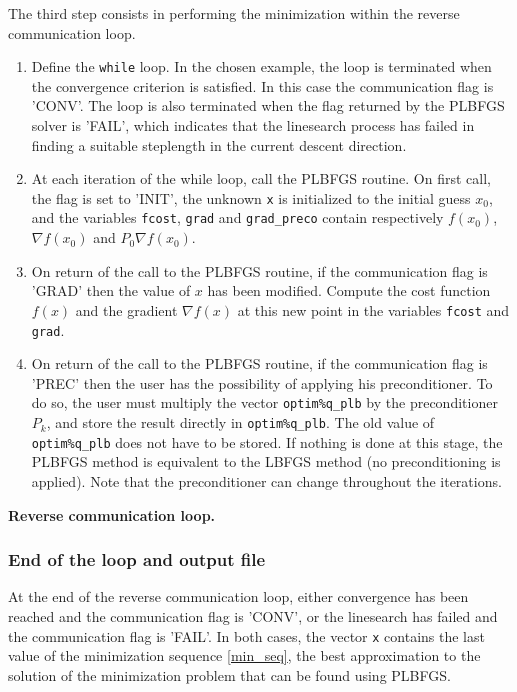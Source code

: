\documentclass[a4paper,twoside,final,onecolumn,11pt,openright]{article}
\begin{document}
The third step consists in performing the minimization within the reverse communication loop. 
\begin{enumerate}
 \item Define the \texttt{while} loop. In the chosen example, the loop is terminated when the convergence criterion is satisfied. In this case the communication flag is 'CONV'. The loop is also terminated when the flag returned by the PLBFGS solver is 'FAIL', which indicates that the linesearch process has failed in finding a suitable steplength in the current descent direction. 
 \item At each iteration of the while loop, call the PLBFGS  routine. On first call, the flag is set to 'INIT', the unknown \texttt{x} is initialized to the initial guess $x_0$, and the variables \texttt{fcost}, \texttt{grad} and \texttt{grad\_preco} contain respectively $f(x_0)$, $\nabla f(x_0)$ and  $P_0\nabla f(x_0)$.
\item On return of the call to the PLBFGS routine, if the communication flag is 'GRAD' then the value of $x$ has been modified. Compute the cost function $f(x)$ and the gradient $\nabla f(x)$ at this new point in the variables \texttt{fcost} and \texttt{grad}.
\item On return of the call to the PLBFGS routine, if the communication flag is 'PREC' then the user has the possibility of applying his preconditioner. To do so, the user must multiply the vector \texttt{optim\%q\_plb} by the preconditioner $P_k$, and store the result directly in \texttt{optim\%q\_plb}. The old value of \texttt{optim\%q\_plb} does not have to be stored. If nothing is done at this stage, the PLBFGS method is equivalent to the LBFGS method (no preconditioning is applied). Note that the preconditioner can change throughout the iterations. 
\end{enumerate}

\framebox{
\small
 
}
\normalsize
\begin{center}
\textbf{Reverse communication loop.} 
\end{center}

\subsubsection{End of the loop and output file}
At the end of the reverse communication loop, either convergence has been reached and the communication flag is 'CONV', or the linesearch has failed and the communication flag is 'FAIL'. In both cases, the vector \texttt{x} contains the last value of the minimization sequence \eqref{min_seq}, the best approximation to the solution of the minimization problem that can be found using PLBFGS. 
\end{document}
